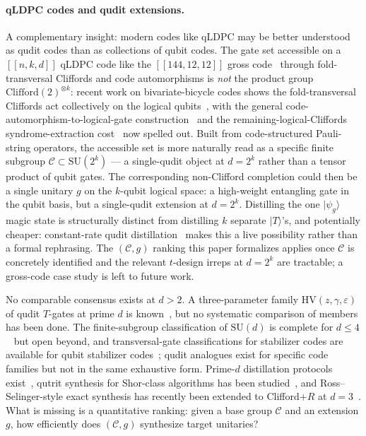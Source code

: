 \documentclass[twocolumn,superscriptaddress,showpacs,nofootinbib,notitlepage,preprintnumbers,secnumarabic,amssymb, nobibnotes, aps, prd]{revtex4-2}
\newcommand{\HV}[3]{\mathrm{HV}(#1,#2,#3)} %
\begin{document}
\paragraph*{qLDPC codes and qudit extensions.}
A complementary insight: modern codes like qLDPC may be better understood as qudit codes than as collections of qubit codes. The gate set accessible on a $[[n,k,d]]$ qLDPC code like the $[[144,12,12]]$ gross code~\cite{Bravyi:2024bb} through fold-transversal Cliffords and code automorphisms is \emph{not} the product group $\mathrm{Clifford}(2)^{\otimes k}$: recent work on bivariate-bicycle codes shows the fold-transversal Cliffords act collectively on the logical qubits~\cite{Eberhardt:2024ft}, with the general code-automorphism-to-logical-gate construction~\cite{Sayginel:2024ca} and the remaining-logical-Cliffords syndrome-extraction cost~\cite{Malcolm:2025qldpc} now spelled out. Built from code-structured Pauli-string operators, the accessible set is more naturally read as a specific finite subgroup $\mathcal{C}\subset\mathrm{SU}(2^k)$ --- a single-qudit object at $d=2^k$ rather than a tensor product of qubit gates. The corresponding non-Clifford completion could then be a single unitary $g$ on the $k$-qubit logical space: a high-weight entangling gate in the qubit basis, but a single-qudit extension at $d=2^k$. Distilling the one $|\psi_g\rangle$ magic state is structurally distinct from distilling $k$ separate $|T\rangle$'s, and potentially cheaper: constant-rate qudit distillation~\cite{WillsHsiehYamasaki:2025,Cervia:2025agc} makes this a live possibility rather than a formal rephrasing. The $(\mathcal{C},g)$ ranking this paper formalizes applies once $\mathcal{C}$ is concretely identified and the relevant $t$-design irreps at $d=2^k$ are tractable; a gross-code case study is left to future work.

No comparable consensus exists at $d>2$. A three-parameter family $\HV{z}{\gamma}{\varepsilon}$ of qudit $T$-gates at prime $d$ is known~\cite{Howard:2012fva}, but no systematic comparison of members has been done. The finite-subgroup classification of $\mathrm{SU}(d)$ is complete for $d \leq 4$~\cite{Blichfeldt:1917,Fairbairn:1964,Flyvbjerg:1985,HananyHe:2001,GrimusLudl:2010} but open beyond, and transversal-gate classifications for stabilizer codes are available for qubit stabilizer codes~\cite{Anderson:2014}; qudit analogues exist for specific code families but not in the same exhaustive form. Prime-$d$ distillation protocols exist~\cite{Campbell:2012jna}, qutrit synthesis for Shor-class algorithms has been studied~\cite{Bocharov:2017qutrit}, and Ross--Selinger-style exact synthesis has recently been extended to Clifford$+R$ at $d=3$~\cite{Gustafson:2025qutrit}. What is missing is a quantitative ranking: given a base group $\mathcal{C}$ and an extension $g$, how efficiently does $(\mathcal{C},g)$ synthesize target unitaries?
\end{document}
